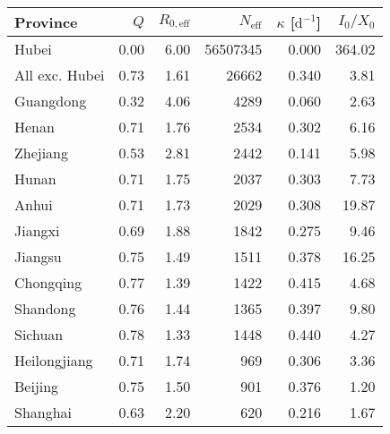 \begin{tabular}{lrrrrr}
\hline
 Province       &   $Q$ &   $R_{0,\mathrm{eff}}$ &   $N_\mathrm{eff}$ &   $\kappa$ [$\mathrm{d}^{-1}$] &   $I_0/X_0$ \\
\hline
 Hubei          &  0.00 &                   6.00 &           56507345 &                          0.000 &      364.02 \\
 All exc. Hubei &  0.73 &                   1.61 &              26662 &                          0.340 &        3.81 \\
 Guangdong      &  0.32 &                   4.06 &               4289 &                          0.060 &        2.63 \\
 Henan          &  0.71 &                   1.76 &               2534 &                          0.302 &        6.16 \\
 Zhejiang       &  0.53 &                   2.81 &               2442 &                          0.141 &        5.98 \\
 Hunan          &  0.71 &                   1.75 &               2037 &                          0.303 &        7.73 \\
 Anhui          &  0.71 &                   1.73 &               2029 &                          0.308 &       19.87 \\
 Jiangxi        &  0.69 &                   1.88 &               1842 &                          0.275 &        9.46 \\
 Jiangsu        &  0.75 &                   1.49 &               1511 &                          0.378 &       16.25 \\
 Chongqing      &  0.77 &                   1.39 &               1422 &                          0.415 &        4.68 \\
 Shandong       &  0.76 &                   1.44 &               1365 &                          0.397 &        9.80 \\
 Sichuan        &  0.78 &                   1.33 &               1448 &                          0.440 &        4.27 \\
 Heilongjiang   &  0.71 &                   1.74 &                969 &                          0.306 &        3.36 \\
 Beijing        &  0.75 &                   1.50 &                901 &                          0.376 &        1.20 \\
 Shanghai       &  0.63 &                   2.20 &                620 &                          0.216 &        1.67 \\

\end{tabular}
